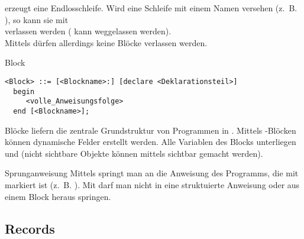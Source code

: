  erzeugt eine Endlosschleife.
Wird eine Schleife mit einem Namen versehen (z.~B.
), so kann sie mit \\
 verlassen werden
( kann weggelassen werden). \\
Mittels  dürfen allerdings keine Blöcke verlassen werden.

\begin{Def}{Block}
\begin{lstlisting}[language=ebnf,
emph={declare,begin,end},
emphstyle=\underbar]
<Block> ::= [<Blockname>:] [declare <Deklarationsteil>]
  begin
     <volle_Anweisungsfolge>
  end [<Blockname>];
\end{lstlisting}
    Blöcke liefern die zentrale Grundstruktur von Programmen in \Ada{}.
    Mittels -Blöcken können dynamische Felder erstellt werden.
    Alle Variablen des Blocks unterliegen  und
    (nicht sichtbare Objekte können mittels
    sichtbar gemacht werden).
\end{Def}

\begin{Def}{Sprunganweisung}
    Mittels  springt man an die Anweisung des Programms,
    die mit  markiert ist (z.~B. ).
    Mit  darf man nicht in eine struktuierte Anweisung oder
    aus einem Block heraus springen.
\end{Def}

\subsection{%
    Records%
}

